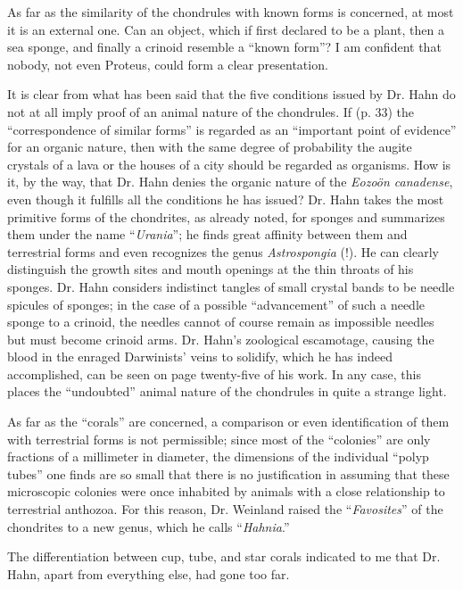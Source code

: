 \documentclass[a4paper, 12pt, oneside]{article}
\begin{document}
As far as the similarity of the chondrules with known forms is concerned, at most it is an external one. Can an object, which if first declared to be a plant, then a sea sponge, and finally a crinoid resemble a ``known form''? I am confident that nobody, not even Proteus, could form a clear presentation.

It is clear from what has been said that the five conditions issued by Dr. Hahn do not at all imply proof of an animal nature of the chondrules. If (p. 33) the ``correspondence of similar forms'' is regarded as an ``important point of evidence'' for an organic nature, then with the same degree of probability the augite crystals of a lava or the houses of a city should be regarded as organisms. How is it, by the way, that Dr. Hahn denies the organic nature of the \emph{Eozoön canadense}, even though it fulfills all the conditions he has issued? Dr. Hahn takes the most primitive forms of the chondrites, as already noted, for sponges and summarizes them under the name ``\emph{Urania}''; he finds great affinity between them and terrestrial forms and even recognizes the genus \emph{Astrospongia} (!). He can clearly distinguish the growth sites and mouth openings at the thin throats of his sponges. Dr. Hahn considers indistinct tangles of small crystal bands to be needle spicules of sponges; in the case of a possible ``advancement'' of such a needle sponge to a crinoid, the needles cannot of course remain as impossible needles but must become crinoid arms. Dr. Hahn's zoological escamotage, causing the blood in the enraged Darwinists' veins to solidify, which he has indeed accomplished, can be seen on page twenty-five of his work. In any case, this places the ``undoubted'' animal nature of the chondrules in quite a strange light.

As far as the ``corals'' are concerned, a comparison or even identification of them with terrestrial forms is not permissible; since most of the ``colonies'' are only fractions of a millimeter in diameter, the dimensions of the individual ``polyp tubes'' one finds are so small that there is no justification in assuming that these microscopic colonies were once inhabited by animals with a close relationship to terrestrial anthozoa. For this reason, Dr. Weinland raised the ``\emph{Favosites}'' of the chondrites to a new genus, which he calls ``\emph{Hahnia}.''

The differentiation between cup, tube, and star corals indicated to me that Dr. Hahn, apart from everything else, had gone too far.
\end{document}
